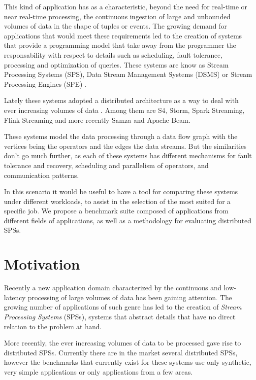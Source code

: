 \documentclass[ppgc,diss,english]{iiufrgs}
\begin{document}
This kind of application has as a characteristic, beyond the need for real-time or near real-time processing, the continuous ingestion of large and unbounded volumes of data in the shape of tuples or events. The growing demand for applications that would meet these requirements led to the creation of systems that provide a programming model that take away from the programmer the responsability with respect to details such as scheduling, fault tolerance, processing and optimization of queries. These systems are know as Stream Processing Systems (SPS), Data Stream Management Systems (DSMS) \cite{chakravarthy2009stream} or Stream Processing Engines (SPE) \cite{abadi2005design}.

Lately these systems adopted a distributed architecture as a way to deal with ever increasing volumes of data \cite{zaharia2012discretized}. Among them are S4, Storm, Spark Streaming, Flink Streaming and more recently Samza and Apache Beam.

These systems model the data processing through a data flow graph with the vertices being the operators and the edges the data streams. But the similarities don't go much further, as each of these systems has different mechanisms for fault tolerance and recovery, scheduling and parallelism of operators, and communication patterns.

In this scenario it would be useful to have a tool for comparing these systems under different workloads, to assist in the selection of the most suited for a specific job. We propose a benchmark suite composed of applications from different fields of applications, as well as a methodology for evaluating distributed SPSs.

\section{Motivation}

Recently a new application domain characterized by the continuous and low-latency processing of large volumes of data has been gaining attention. The growing number of applications of such genre has led to the creation of \emph{Stream Processing Systems} (SPSs), systems that abstract details that have no direct relation to the problem at hand.

More recently, the ever increasing volumes of data to be processed gave rise to distributed SPSs. Currently there are in the market several distributed SPSs, however the benchmarks that currently exist for these systems use only synthetic, very simple applications or only applications from a few areas.
\end{document}
